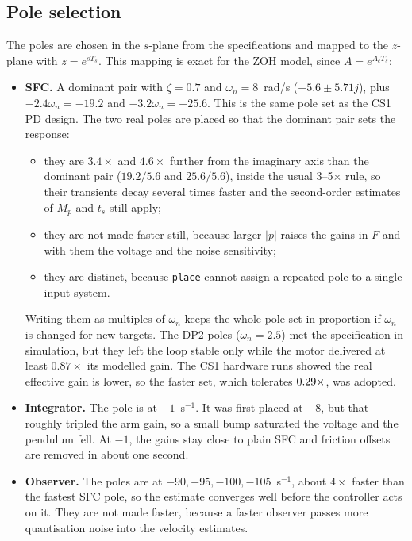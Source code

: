 \documentclass[11pt,a4paper]{article}
\begin{document}
\subsection{Pole selection}
The poles are chosen in the $s$-plane from the specifications and mapped
to the $z$-plane with $z=e^{sT_s}$. This mapping is exact for the ZOH
model, since $A=e^{A_cT_s}$:
\begin{itemize}[nosep]
\item \textbf{SFC.} A dominant pair with $\zeta=0.7$ and $\omega_n=8$~rad/s
  ($-5.6\pm5.71j$), plus $-2.4\omega_n=-19.2$ and $-3.2\omega_n=-25.6$.
  This is the same pole set as the CS1 PD design. The two real poles are
  placed so that the dominant pair sets the response:
  \begin{itemize}[nosep]
  \item they are $3.4\times$ and $4.6\times$ further from the imaginary
    axis than the dominant pair ($19.2/5.6$ and $25.6/5.6$), inside the
    usual 3--5$\times$ rule, so their transients decay several times faster
    and the second-order estimates of $M_p$ and $t_s$ still apply;
  \item they are not made faster still, because larger $|p|$ raises the
    gains in $F$ and with them the voltage and the noise sensitivity;
  \item they are distinct, because \texttt{place} cannot assign a repeated
    pole to a single-input system.
  \end{itemize}
  Writing them as multiples of $\omega_n$ keeps the whole pole set in
  proportion if $\omega_n$ is changed for new targets. The DP2 poles ($\omega_n=2.5$) met the specification
  in simulation, but they left the loop stable only while the motor
  delivered at least $0.87\times$ its modelled gain. The CS1 hardware
  runs showed the real effective gain is lower, so the faster set, which
  tolerates $0.29\times$, was adopted.
\item \textbf{Integrator.} The pole is at $-1$~s$^{-1}$. It was first
  placed at $-8$, but that roughly tripled the arm gain, so a small bump
  saturated the voltage and the pendulum fell. At $-1$, the gains stay
  close to plain SFC and friction offsets are removed in about one second.
\item \textbf{Observer.} The poles are at $-90,-95,-100,-105$~s$^{-1}$,
  about $4\times$ faster than the fastest SFC pole, so the estimate
  converges well before the controller acts on it. They are not made
  faster, because a faster observer passes more quantisation noise into
  the velocity estimates.
\end{itemize}
\end{document}
